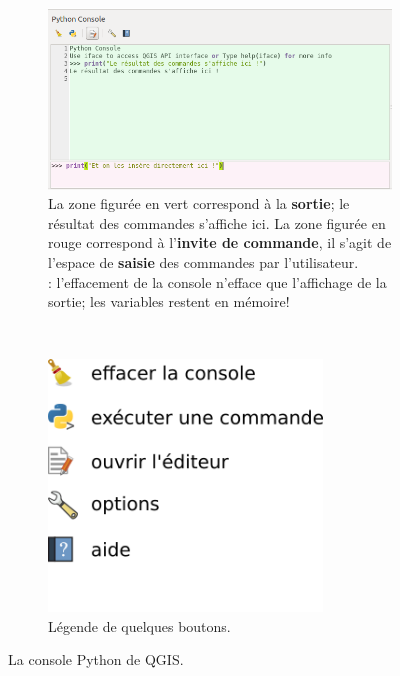 \documentclass[11pt]{article}
\begin{document}
\begin{figure}[H]
    \centering
    \begin{subfigure}[t]{0.70\textwidth}
		
        \includegraphics[width=1\textwidth]{python_console_qgis3_colored.png}
\caption{La zone figurée en \colorbox{mygreen!32}{vert} correspond à la \textbf{sortie}; le résultat des commandes s'affiche ici. La zone figurée en \colorbox{myred!32}{rouge} correspond à l'\textbf{invite de commande}, il s'agit de l'espace de \textbf{saisie} des commandes par l'utilisateur.\\
\underline{}: l'effacement de la console n'efface que l'affichage de la sortie; les variables restent en mémoire!}\label{fig1:consolepython}
    \end{subfigure}%
    ~
    \begin{subfigure}[t]{0.32\textwidth}
        \hspace*{2em}
        \includegraphics[width=0.8\textwidth]{drawing_console.png}
        \caption{Légende de quelques boutons.}\label{fig1:icons}
    \end{subfigure}
    \label{fig1}
    \caption{La console Python de QGIS.}
\end{figure}
\end{document}
